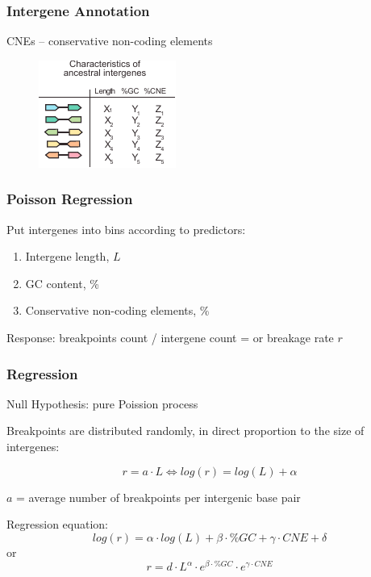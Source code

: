 \documentclass[svgnames,14pt]{beamer}
\begin{document}
\begin{frame}
\frametitle{Intergene Annotation}
CNEs -- conservative non-coding elements
\begin{figure}
	\centering
	\includegraphics[scale = 2.50]{Annotation.pdf}
\end{figure}
\end{frame}

\begin{frame}
\frametitle{Poisson Regression}
Put intergenes into bins according to predictors:
\begin{enumerate}
\item Intergene length, $L$
\item GC content, \% 
\item Conservative non-coding elements, \%
\end{enumerate}

\vspace{12pt}
Response: breakpoints count / intergene count = or breakage rate $r$
\end{frame}

\begin{frame}
\frametitle{Regression}
Null Hypothesis: pure Poission process

\vspace{12pt}	
Breakpoints are distributed randomly, in direct proportion to
the size of intergenes:

$$r = a \cdot L \Leftrightarrow log(r) = log(L) + \alpha$$

$a$ = average number of breakpoints per intergenic base pair

\pause
\vspace{12pt}
Regression equation:
$$log(r) = \alpha \cdot log(L) + \beta  \cdot \% GC + \gamma  \cdot CNE + \delta$$
or 
$$r = d  \cdot L^\alpha  \cdot e ^ {\beta  \cdot \% GC}  \cdot e ^ {\gamma  \cdot CNE}$$
\end{frame}
\end{document}
